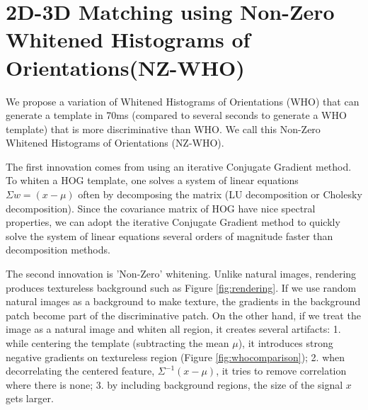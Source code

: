 \documentclass[10pt,twocolumn,letterpaper]{article}
\begin{document}

\section{2D-3D Matching using Non-Zero Whitened Histograms of Orientations(NZ-WHO)}
\label{sec:nz-who}


We propose a variation of Whitened Histograms of Orientations (WHO) \cite{Hariharan12} that can generate a template in 70ms (compared to several seconds to generate a WHO template) that is more discriminative than WHO. We call this Non-Zero Whitened Histograms of Orientations (NZ-WHO). 

The first innovation comes from using an iterative Conjugate Gradient method. To whiten a HOG template, one solves a system of linear equations $\Sigma w = (x - \mu)$ often by decomposing the matrix (LU decomposition or Cholesky decomposition). Since the covariance matrix of HOG have nice spectral properties, we can adopt the iterative Conjugate Gradient method to quickly solve the system of linear equations several orders of magnitude faster than decomposition methods.

The second innovation is 'Non-Zero' whitening. Unlike natural images, rendering produces textureless background such as Figure \ref{fig:rendering}. If we use random natural images as a background to make texture, the gradients in the background patch become part of the discriminative patch. On the other hand, if we treat the image as a natural image and whiten all region, it creates several artifacts: 1. while centering the template (subtracting the mean $\mu$), it introduces strong negative gradients on textureless region (Figure \ref{fig:whocomparison}); 2. when decorrelating the centered feature, $\Sigma^{-1}(x - \mu)$, it tries to remove correlation where there is none; 3. by including background regions, the size of the signal $x$ gets larger. 
\end{document}
